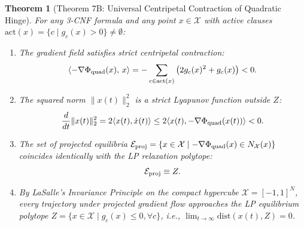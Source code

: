 \documentclass[11pt,a4paper]{article}
\newtheorem{theorem}{Theorem}[section]
\begin{document}
\begin{theorem}[Theorem 7B: Universal Centripetal Contraction of Quadratic Hinge]
\label{thm:universal_contraction}
For any 3-CNF formula and any point $x \in \mathcal{X}$ with active clauses $\text{act}(x) = \{c \mid g_c(x) > 0\} \ne \emptyset$:
\begin{enumerate}
    \item The gradient field satisfies strict centripetal contraction:
    \begin{equation}
    \langle -\nabla \Phi_{\rm quad}(x), \, x \rangle = -\sum_{c \in \text{act}(x)} \left(2 g_c(x)^2 + g_c(x)\right) < 0.
    \end{equation}
    \item The squared norm $\|x(t)\|_2^2$ is a strict Lyapunov function outside $Z$:
    \begin{equation}
    \frac{d}{dt} \|x(t)\|_2^2 = 2 \langle x(t), \dot{x}(t) \rangle \le 2 \langle x(t), -\nabla \Phi_{\rm quad}(x(t)) \rangle < 0.
    \end{equation}
    \item The set of projected equilibria $\mathcal{E}_{\rm proj} = \{x \in \mathcal{X} \mid -\nabla \Phi_{\rm quad}(x) \in N_{\mathcal{X}}(x)\}$ coincides identically with the LP relaxation polytope:
    \begin{equation}
    \mathcal{E}_{\rm proj} \equiv Z.
    \end{equation}
    \item By LaSalle's Invariance Principle on the compact hypercube $\mathcal{X} = [-1, 1]^N$, every trajectory under projected gradient flow approaches the LP equilibrium polytope $Z = \{x \in \mathcal{X} \mid g_c(x) \le 0, \forall c\}$, i.e., $\lim_{t \to \infty} \text{dist}(x(t), Z) = 0$.
\end{enumerate}
\end{theorem}
\end{document}
